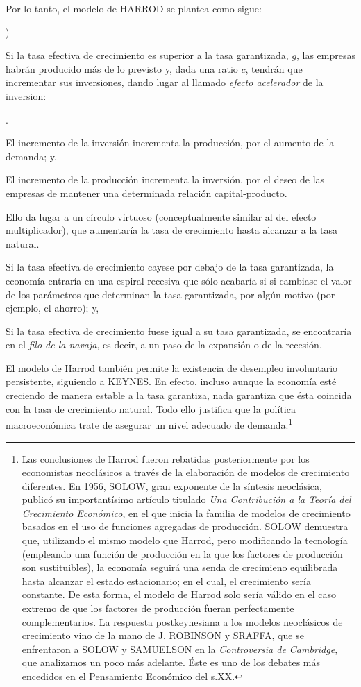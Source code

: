 \documentclass[10pt,a4paper]{article}
\newcounter{alphaitem}
\newcounter{numitem}
\newenvironment{la}
      {\begin{list}{\alph{alphaitem})}{%
          \usecounter{alphaitem}%
          \setlength{\leftmargin}{1cm}%
          \setlength{\parskip}{3pt}%
          \setlength{\itemsep}{0pt}%
          \setlength{\parsep}{0pt}%
      }}
      {\end{list}}
\newenvironment{lnum}
      {\begin{list}{\arabic{numitem}.}{%
          \usecounter{numitem}%
          \setlength{\leftmargin}{1cm}%
          \setlength{\parskip}{3pt}%
          \setlength{\itemsep}{0pt}%
          \setlength{\parsep}{0pt}%
      }}
      {\end{list}}
\begin{document}
Por lo tanto, el modelo de HARROD se plantea como sigue:
\begin{la}
    \item Si la tasa efectiva de crecimiento es superior a la tasa garantizada, $g$, las empresas habrán producido más de lo previsto y, dada una ratio $c$, tendrán que incrementar sus inversiones, dando lugar al llamado \textit{efecto acelerador} de la inversion:
    \begin{lnum}
        \item El incremento de la inversión incrementa la producción, por el aumento de la demanda; y,
        \item El incremento de la producción incrementa la inversión, por el deseo de las empresas de mantener una determinada relación capital-producto.
    \end{lnum}
    Ello da lugar a un círculo virtuoso (conceptualmente similar al del efecto multiplicador), que aumentaría la tasa de crecimiento hasta alcanzar a la tasa natural.
    \item Si la tasa efectiva de crecimiento cayese por debajo de la tasa garantizada, la economía entraría en una espiral recesiva que sólo acabaría si si cambiase el valor de los parámetros que determinan la tasa garantizada, por algún motivo (por ejemplo, el ahorro); y,
    \item Si la tasa efectiva de crecimiento fuese igual a su tasa garantizada, se encontraría en el \textit{filo de la navaja}, es decir, a un paso de la expansión o de la recesión.
\end{la}

El modelo de Harrod también permite la existencia de desempleo involuntario persistente, siguiendo a KEYNES. En efecto, incluso aunque la economía esté creciendo de manera estable a la tasa garantiza, nada garantiza que ésta coincida con la tasa de crecimiento natural. Todo ello justifica que la política macroeconómica trate de asegurar un nivel adecuado de demanda.\footnote{%
    Las conclusiones de Harrod fueron rebatidas posteriormente por los economistas neoclásicos a través de la elaboración de modelos de crecimiento diferentes. En 1956, SOLOW, gran exponente de la síntesis neoclásica, publicó su importantísimo artículo titulado \textit{Una Contribución a la Teoría del Crecimiento Económico}, en el que inicia la familia de modelos de crecimiento basados en el uso de funciones agregadas de producción. SOLOW demuestra que, utilizando el mismo modelo que Harrod, pero modificando la tecnología (empleando una función de producción en la que los factores de producción son sustituibles), la economía seguirá una senda de crecimieno equilibrada hasta alcanzar el estado estacionario; en el cual, el crecimiento sería constante. De esta forma, el modelo de Harrod solo sería válido en el caso extremo de que los factores de producción fueran perfectamente complementarios. La respuesta postkeynesiana a los modelos neoclásicos de crecimiento vino de la mano de J. ROBINSON y SRAFFA, que se enfrentaron a SOLOW y SAMUELSON en la \textit{Controversia de Cambridge}, que analizamos un poco más adelante. Éste es uno de los debates más encedidos en el Pensamiento Económico del s.XX.
} 
\end{document}
